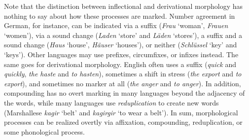 Note that the distinction between inflectional and derivational morphology has nothing to say about how these processes are marked.
Number agreement in German, for instance, can be indicated via a suffix (\emph{Frau} `woman', \emph{Frauen} `women'), via a sound change (\emph{Laden} `store' and \emph{Läden} `stores'), a suffix and a sound change (\emph{Haus} `house', \emph{Häuser} `houses'), or neither (\emph{Schlüssel} `key' and `keys').
Other languages may use prefixes, circumfixes, or infixes instead.
The same goes for derivational morphology.
English often uses a suffix (\emph{quick} and \emph{quickly}, \emph{the haste} and \emph{to hasten}), sometimes a shift in stress (\emph{the export} and \emph{to export}), and sometimes no marker at all (\emph{the anger} and \emph{to anger}).
In addition, compounding has no overt marking in many languages beyond the adjacency of the words, while many languages use \emph{reduplication} to create new words (Marshallese \emph{kagir} `belt' and \emph{kagirgir} `to wear a belt').
In sum, morphological processes can be realized overtly via affixation, compounding, reduplication, or some phonological process.


